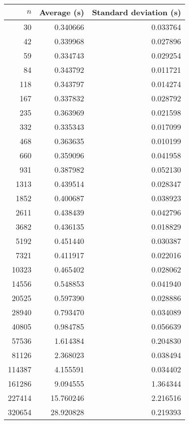 \begin{tabular}{rrr}
$n$ & Average (s) & Standard deviation (s)\\\hline
30 & 0.340666 & 0.033764\\
42 & 0.339968 & 0.027896\\
59 & 0.334743 & 0.029254\\
84 & 0.343792 & 0.011721\\
118 & 0.343797 & 0.014274\\
167 & 0.337832 & 0.028792\\
235 & 0.363969 & 0.021598\\
332 & 0.335343 & 0.017099\\
468 & 0.363635 & 0.010199\\
660 & 0.359096 & 0.041958\\
931 & 0.387982 & 0.052130\\
1313 & 0.439514 & 0.028347\\
1852 & 0.400687 & 0.038923\\
2611 & 0.438439 & 0.042796\\
3682 & 0.436135 & 0.018829\\
5192 & 0.451440 & 0.030387\\
7321 & 0.411917 & 0.022016\\
10323 & 0.465402 & 0.028062\\
14556 & 0.548853 & 0.041940\\
20525 & 0.597390 & 0.028886\\
28940 & 0.793470 & 0.034089\\
40805 & 0.984785 & 0.056639\\
57536 & 1.614384 & 0.204830\\
81126 & 2.368023 & 0.038494\\
114387 & 4.155591 & 0.034402\\
161286 & 9.094555 & 1.364344\\
227414 & 15.760246 & 2.216516\\
320654 & 28.920828 & 0.219393\\
\end{tabular}
